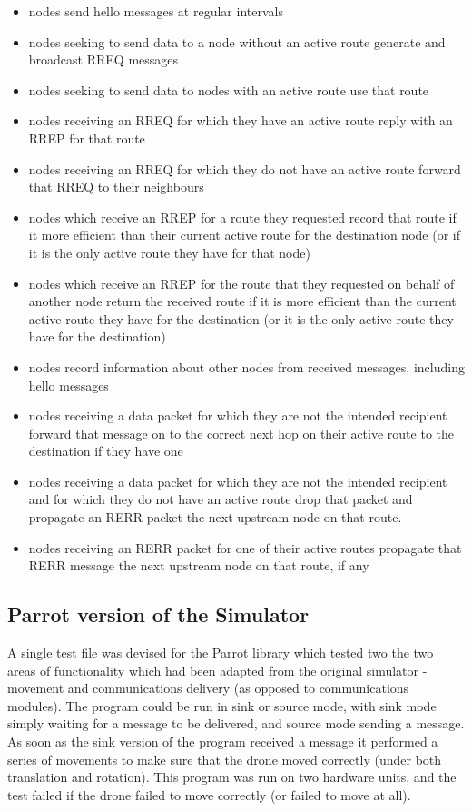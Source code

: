 \begin{itemize}
\item nodes send hello messages at regular intervals
\item nodes seeking to send data to a node without an active route generate and broadcast RREQ messages
\item nodes seeking to send data to nodes with an active route use that route
\item nodes receiving an RREQ for which they have an active route reply with an RREP for that route
\item nodes receiving an RREQ for which they do not have an active route forward that RREQ to their neighbours
\item nodes which receive an RREP for a route they requested record that route if it more efficient than their current active route for the destination node (or if it is the only active route they have for that node)
\item nodes which receive an RREP for the route that they requested on behalf of another node return the received route if it is more efficient than the current active route they have for the destination (or it is the only active route they have for the destination)
\item nodes record information about other nodes from received messages, including hello messages
\item nodes receiving a data packet for which they are not the intended recipient forward that message on to the correct next hop on their active route to the destination if they have one
\item nodes receiving a data packet for which they are not the intended recipient and for which they do not have an active route drop that packet and propagate an RERR packet the next upstream node on that route.
\item nodes receiving an RERR packet for one of their active routes propagate that RERR message the next upstream node on that route, if any
\end{itemize}

\subsection{Parrot version of the Simulator}
A single test file was devised for the Parrot library which tested two the two areas of functionality which had been adapted from the original simulator - movement and communications delivery (as opposed to communications modules). The program could be run in sink or source mode, with sink mode simply waiting for a message to be delivered, and source mode sending a message. As soon as the sink version of the program received a message it performed a series of movements to make sure that the drone moved correctly (under both translation and rotation). This program was run on two hardware units, and the test failed if the drone failed to move correctly (or failed to move at all).

